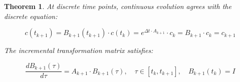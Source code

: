 \documentclass[11pt,a4paper]{article}
\theoremstyle{plain}
\newtheorem{theorem}{Theorem}[section]
\theoremstyle{definition}
\begin{document}
\begin{theorem}
\vspace{0.5em}

At discrete time points, continuous evolution agrees with the discrete equation:

\vspace{0.5em}

\begin{equation}
c(t_{k+1}) = B_{k+1}(t_{k+1}) \cdot c(t_k) = e^{\Delta t \cdot A_{k+1}} \cdot c_k = B_{k+1} \cdot c_k = c_{k+1}
\end{equation}

\vspace{0.5em}

The incremental transformation matrix satisfies:

\vspace{0.5em}

\begin{equation}
\boxed{
\frac{dB_{k+1}(\tau)}{d\tau} = A_{k+1} \cdot B_{k+1}(\tau), \quad \tau \in [t_k, t_{k+1}], \quad B_{k+1}(t_k) = I
}
\label{eq:diff_eq_incremental}
\end{equation}

\vspace{0.5em}

\end{theorem}
\end{document}
